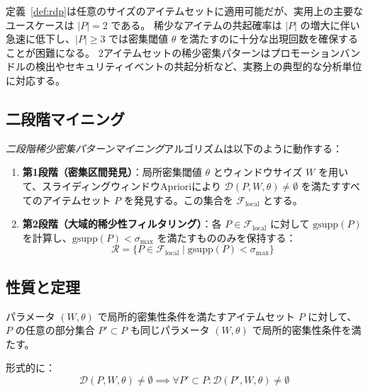 \begin{remark}[実用上のアイテムセットサイズ]
定義~\ref{def:rdp}は任意のサイズのアイテムセットに適用可能だが、実用上の主要なユースケースは $|P| = 2$ である。
稀少なアイテムの共起確率は $|P|$ の増大に伴い急速に低下し、$|P| \geq 3$ では密集閾値 $\theta$ を満たすのに十分な出現回数を確保することが困難になる。
2アイテムセットの稀少密集パターンはプロモーションバンドルの検出やセキュリティイベントの共起分析など、実務上の典型的な分析単位に対応する。
\end{remark}

\subsection{二段階マイニング}

\begin{definition}[二段階マイニング]\label{def:two_phase}
\emph{二段階稀少密集パターンマイニング}アルゴリズムは以下のように動作する：
\begin{enumerate}
\item \textbf{第1段階（密集区間発見）}：局所密集閾値 $\theta$ とウィンドウサイズ $W$ を用いて、スライディングウィンドウAprioriにより $\mathcal{D}(P, W, \theta) \neq \emptyset$ を満たすすべてのアイテムセット $P$ を発見する。この集合を $\mathcal{F}_{\text{local}}$ とする。
\item \textbf{第2段階（大域的稀少性フィルタリング）}：各 $P \in \mathcal{F}_{\text{local}}$ に対して $\text{gsupp}(P)$ を計算し、$\text{gsupp}(P) < \sigma_{\max}$ を満たすもののみを保持する：
\begin{equation}
\mathcal{R} = \{P \in \mathcal{F}_{\text{local}} \mid \text{gsupp}(P) < \sigma_{\max}\}
\end{equation}
\end{enumerate}
\end{definition}

\subsection{性質と定理}

\begin{theorem}[局所密集性の弱反単調性]\label{thm:weak_antimon}
パラメータ $(W, \theta)$ で局所的密集性条件を満たすアイテムセット $P$ に対して、
$P$ の任意の部分集合 $P' \subset P$ も同じパラメータ $(W, \theta)$ で局所的密集性条件を満たす。

形式的に：
\begin{equation}
\mathcal{D}(P, W, \theta) \neq \emptyset \implies \forall P' \subset P: \mathcal{D}(P', W, \theta) \neq \emptyset
\end{equation}
\end{theorem}


